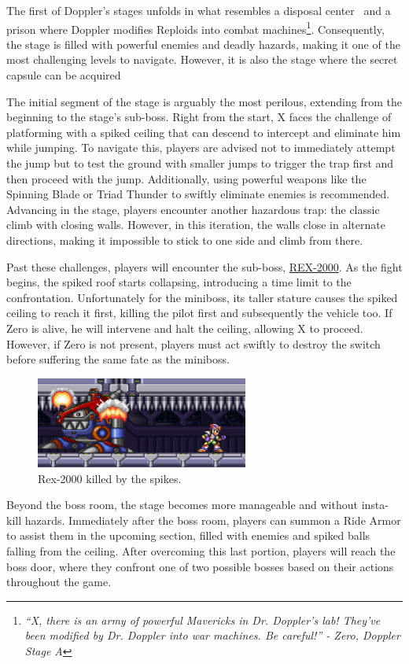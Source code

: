 The first of Doppler's stages unfolds in what resembles a disposal center~\cite{wiki:Doppler_stage} and a prison where Doppler modifies Reploids into combat machines\footnote{\textit{``X, there is an army of powerful Mavericks in Dr. Doppler’s lab! They’ve been modified by Dr. Doppler into war machines. Be careful!'' - Zero, Doppler Stage A}}. Consequently, the stage is filled with powerful enemies and deadly hazards, making it one of the most challenging levels to navigate. However, it is also the stage where the secret capsule can be acquired

The initial segment of the stage is arguably the most perilous, extending from the beginning to the stage's sub-boss. Right from the start, X faces the challenge of platforming with a spiked ceiling that can descend to intercept and eliminate him while jumping. To navigate this, players are advised not to immediately attempt the jump but to test the ground with smaller jumps to trigger the trap first and then proceed with the jump. Additionally, using powerful weapons like the Spinning Blade or Triad Thunder to swiftly eliminate enemies is recommended. Advancing in the stage, players encounter another hazardous trap: the classic climb with closing walls. However, in this iteration, the walls close in alternate directions, making it impossible to stick to one side and climb from there.

Past these challenges, players will encounter the sub-boss, \hyperlink{miniboss:REX}{REX-2000}. As the fight begins, the spiked roof starts collapsing, introducing a time limit to the confrontation. Unfortunately for the miniboss, its taller stature causes the spiked ceiling to reach it first, killing the pilot first and subsequently the vehicle too. If Zero is alive, he will intervene and halt the ceiling, allowing X to proceed. However, if Zero is not present, players must act swiftly to destroy the switch before suffering the same fate as the miniboss.
\begin{figure}[htp]
	\centering
	\includegraphics[height=3cm]{figures/X3/Doppler_stages/drex_kill.jpg}
	\caption{Rex-2000 killed by the spikes.}
\end{figure}
Beyond the boss room, the stage becomes more manageable and without insta-kill hazards. Immediately after the boss room, players can summon a Ride Armor to assist them in the upcoming section, filled with enemies and spiked balls falling from the ceiling. After overcoming this last portion, players will reach the boss door, where they confront one of two possible bosses based on their actions throughout the game.


